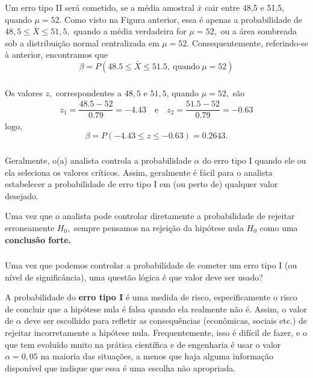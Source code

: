\documentclass[14pt,aspectratio=1610]{beamer}
\newcommand{\bx}{\ensuremath{\bar{x}}}
\newcommand{\Ho}{\ensuremath{H_{0}}}
\begin{document}
\begin{frame}{}
\frametitle{}
\begin{block}{}
\justifying
Um erro tipo II será cometido, se a média amostral $\bx$ cair entre 48,5 e 51,5, quando $\mu = 52.$ Como visto na Figura anterior, essa é apenas a probabilidade de 
$48,5 \leq \bar{X} \leq 51,5,$ quando a média verdadeira for $\mu = 52,$ ou a área sombreada sob a distribuição normal centralizada em $\mu = 52.$ Consequentemente, 
referindo-se à anterior, encontramos que $$\beta=P(48.5\leq\bar{X}\leq 51.5,\ \textrm{quando}\ \mu=52)$$
\end{block}
\end{frame}

\begin{frame}{}
\frametitle{}
\begin{block}{}
Os valores $z,$ correspondentes a $48,5$ e $51,5$, quando $\mu = 52,$ são
\begin{align*}
z_{1}=\dfrac{48.5-52}{0.79}=-4.43\quad \textrm{e}\quad z_{2}=\dfrac{51.5-52}{0.79}=-0.63
\end{align*}
logo, $$\beta=P(-4.43\leq z\leq -0.63)=0.2643.$$
\end{block}
\end{frame}

\begin{frame}{}
\frametitle{}
\begin{block}{}
\justifying
Geralmente, o(a) analista controla a probabilidade $\alpha$ do erro tipo I quando ele ou ela seleciona os valores críticos. Assim, geralmente é fácil para o analista 
estabelecer a probabilidade de erro tipo I em (ou perto de) qualquer valor desejado. 
\end{block}
\pause
\begin{block}{}
\justifying
Uma vez que o analista pode controlar diretamente a probabilidade de rejeitar erroneamente $\Ho,$ sempre pensamos na rejeição da hipótese nula $\Ho$ como uma 
\textbf{conclusão forte.}
\end{block}
\end{frame}

\begin{frame}{}
\frametitle{}
\begin{block}{}
\justifying
Uma vez que podemos controlar a probabilidade de cometer um erro tipo I (ou nível de significância), uma questão lógica é que valor deve ser usado?
\end{block}
\pause
\begin{block}{}
\justifying
A probabilidade do \textbf{erro tipo I} é uma medida de risco, especificamente o risco de concluir que a hipótese nula é falsa quando ela realmente não é. Assim, o valor 
de $\alpha$ deve ser escolhido para refletir as consequências (econômicas, sociais etc.) de rejeitar incorretamente a hipótese nula. Frequentemente, isso é difícil de fazer, 
e o que tem evoluído muito na prática científica e de engenharia é usar o valor $\alpha = 0,05$ na maioria das situações, a menos que haja alguma informação disponível 
que indique que essa é uma escolha não apropriada. 
\end{block}
\end{frame}
\end{document}
